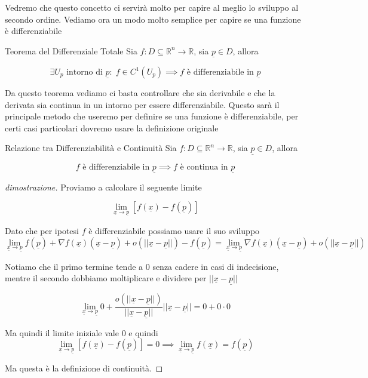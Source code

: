 \documentclass{rapport}
\begin{document}
Vedremo che questo concetto ci servirà molto per capire al meglio lo sviluppo al secondo ordine. Vediamo ora un modo molto semplice per capire se una funzione è differenziabile

\begin{proposizione}{Teorema del Differenziale Totale}{}
  Sia $f: D \subseteq \mathbb{R}^n \to \mathbb{R}$, sia $\underline{p}\in D$, allora 

  \[
  \exists U_p \text{ intorno di } \underline{p}: \; f \in C^1(U_p) \implies f \text{ è differenziabile in } \underline{p}
  \]
\end{proposizione}

Da questo teorema vediamo ci basta controllare che sia derivabile e che la derivata sia continua in un intorno per essere differenziabile. Questo sarà il principale metodo che useremo per definire se una funzione è differenziabile, per certi casi particolari dovremo usare la definizione originale

\newpage
\begin{teorema}{Relazione tra Differenziabilità e Continuità}{}
  Sia $f: D \subseteq \mathbb{R}^n \to \mathbb{R}$, sia $\underline{p}\in D$, allora 

  \[
  f \text{ è differenziabile in } \underline{p} \implies f \text{ è continua in } \underline{p}
  \]
\end{teorema}

\begin{proof}[dimostrazione]
  Proviamo a calcolare il seguente limite 

  \[
  \lim_{\underline{x} \to \underline{p}} \left[f(\underline{x}) - f(\underline{p}) \right]
  \]

  Dato che per ipotesi $f$ è differenziabile possiamo usare il suo sviluppo
  \[
  \lim_{\underline{x} \to \underline{p}} f(\underline{p}) + \nabla f(\underline{x}) (\underline{x} - \underline{p}) + o(||\underline{x} - \underline{p}||)  - f(\underline{p}) = \lim_{\underline{x} \to \underline{p}}\nabla f(\underline{x}) (\underline{x} - \underline{p}) + o(||\underline{x} - \underline{p}||)
  \]

  Notiamo che il primo termine tende a $0$ senza cadere in casi di indecisione, mentre il secondo dobbiamo moltiplicare e dividere per $|| \underline{x} - \underline{p}||$

  \[
  \lim_{\underline{x} \to \underline{p}}0 + \dfrac{o(||\underline{x} - \underline{p}||)}{||\underline{x} - \underline{p}||} ||\underline{x} - \underline{p}|| =   0 + 0\cdot 0
  \]

  Ma quindi il limite iniziale vale $0$ e quindi 
  \[
  \lim_{\underline{x} \to \underline{p}} \left[f(\underline{x}) - f(\underline{p}) \right] = 0 \implies \lim_{\underline{x} \to \underline{p}} f(\underline{x})  = f(\underline{p})
  \]

  Ma questa è la definizione di continuità.
\end{proof}
\end{document}
